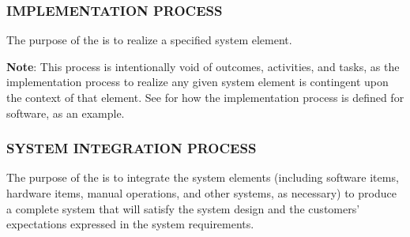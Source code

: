 		\newpage
		\subsubsection{IMPLEMENTATION PROCESS\label{proc:implementation_process}}

			\begin{adjustwidth}{2em}{0pt} 
				
				The purpose of the  is to realize a specified system element.

				{\bf Note}: This process is intentionally void of outcomes, activities, and tasks, as the implementation process to realize any given system element is contingent upon the context of that element. See  for how the implementation process is defined for software, as an example. 

			\end{adjustwidth}

		\newpage
		\subsubsection{SYSTEM INTEGRATION PROCESS\label{proc:system_integration_process}}

			\begin{adjustwidth}{2em}{0pt} 

				The purpose of the  is to integrate the system elements (including software items, hardware items, manual operations, and other systems, as necessary) to produce a complete system that will satisfy the system design and the customers’ expectations expressed in the system requirements.

			\end{adjustwidth}


